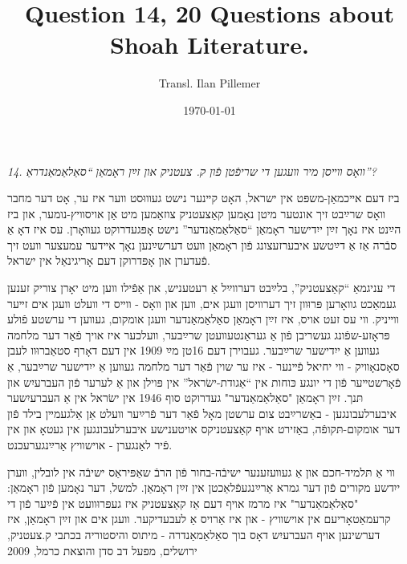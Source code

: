 \documentclass{article}
\begin{document}
\renewcommand{\abstractname}{\vspace{-\baselineskip}}
\title{Question 14, 20 Questions about Shoah Literature.}
\author{Transl. Ilan Pillemer}
\date{\today}

\maketitle
{}
\newline

\begin{pairs}

\begin{Rightside}

\begin{RTL}
\begin{hebrew}
\beginnumbering
\autopar
\emph{
14.
װאָס װײסן מיר װעגען די שריפֿטן פֿון ק. צעטניק און זײַן ראָמאַן ``סאַלאַמאַנדראַ''?
}
\newline

ביז דעם אײכמאַן-משפּט אין ישראל, האָט קײנער נישט געװוּסט װער איז ער, אָט דער מחבר װאָס שרײַבט זיך אונטער מיטן נאָמען קאַצעטניק צוזאַמען מיט אַן אויסװיץ-נומער,
און ביז הײַנט איז נאָך זײַן ייִדישער ראָמאַן ``סאַלאַמאַנדער'' נישט אָפּגעדרוקט געװאָרן.
עס איז דאָ אַ סבֿרה אַז אַ דײַטשע איבערזעצונג פֿון ראָמאַן װעט דערשײַנען נאָך אײדער עמעצער װעט זיך פֿעדערן און אָפּדרוקן דעם אָריגינאַל אין ישראל.


די עניגמאַ ``קאַצעטניק'', בלײַבט דערװײַל אַ רעטעניש, און אַפֿילו װען מיט יאָרן צוריק זענען געמאַכט גװאָרען פּרוּװן זיך דערװיסן װעגן אים, װען און װאָס -
װײס די װעלט װעגן אים זײער װײניק.
װי עס זעט אויס, איז זײַן ראָמאַן סאַלאַמאַנדער װעגן אומקום, געװען די ערשטע פֿולע פּראָזע-שפֿונג געשריבן פֿון אַ געראַנטעװעטן שרײַבער, װעלכער איז אויך פֿאַר דער מלחמה
געװען אַ ייִדישער שרײַבער. 
געבוירן דעם 16טן מײַ 1909 אין דעם דאָרף סטאַברוּװ לעבן סאָסנאָװיק -
װי יחיאל פֿײנער - איז ער שוין פֿאַר דער מלחמה געװען אַ ייִדישער שרײַבער, אַ פֿאָרשטײער פֿון די יונגע כּוחות אין ``אַגודת-ישׂראל'' אין פּוילן 
און אַ לערער פֿון העברעיִש און תּנך.
זײַן ראָמאַן "סאַלאַמאַנדער" געדרוקט סוף 1946 אין ישׂראל אין אַ העברעיִשער איבערלעבונגען -
באַשרײַבט צום ערשטן מאָל פֿאַר דער פֿרײַער װעלט אַן אַלגעמײן בילד פֿון דער אומקום-תּקופֿה, 
באַזירט אויף קאַצעטניקס אויטענישע איבערלעבונגען אין געטאָ און אין פֿיר לאַנגערן - אוישװיץ אַרײַנגערעכנט.


װי אַ תּלמיד-חכם און אַ געװעזענער ישיבֿה-בחור פֿון הרבֿ שאַפּיראַס ישיבֿה אין לובלין, װערן ייִדשע  מקורים פֿון דער גמרא אַרײַנגעפֿלאַכטן אין זײַן ראָמאַן.
למשל, דער נאָמען פֿון ראָמאַן: "סאַלאַמאַנדער" איז מרמז אויף דעם אַז קאַצעטניק איז געפּרוּװעט אין פֿײַער פֿון די קרעמאַטאָריעם אין אוישװיץ - און 
איז אַרויס אַ לעבעדיקער. 
װעגן אים און זײַן  ראָמאַן, איז דערשינען אויף העברעיִש דאָס בוך סאַלאַמאַנדרה - מיתוס והיסטוריה בכתבי ק.צעטניק, ירושלים,  מפעל דב סדן והוצאת כרמל, 2009


\end{hebrew}
\end{RTL}
\end{Rightside}
\end{pairs}
\end{document}
